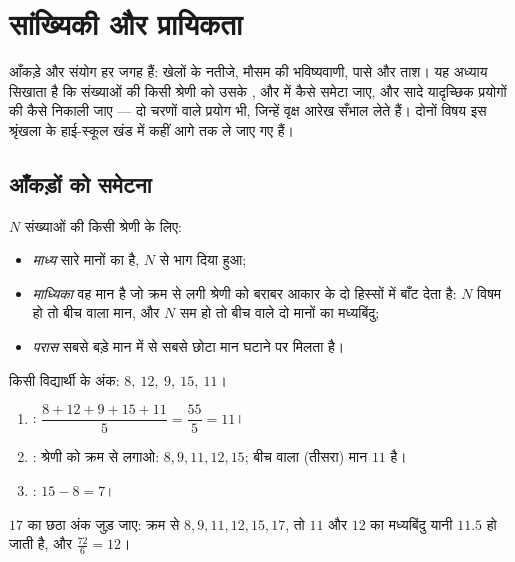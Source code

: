 \chapter{सांख्यिकी और प्रायिकता}\label{ch:g9:statproba}

आँकड़े और संयोग हर जगह हैं: खेलों के नतीजे, मौसम की भविष्यवाणी, पासे
और ताश।
यह अध्याय सिखाता है कि संख्याओं की किसी श्रेणी को उसके ,
 और  में कैसे समेटा जाए, और सादे यादृच्छिक प्रयोगों की
 कैसे निकाली जाए --- दो चरणों वाले प्रयोग भी, जिन्हें वृक्ष
आरेख सँभाल लेते हैं। दोनों विषय इस श्रृंखला के हाई-स्कूल खंड में
कहीं आगे तक ले जाए गए हैं।

\section{आँकड़ों को समेटना}

\begin{definition}[माध्य, माध्यिका, परास]\label{def:g9:statproba:indicators}
$N$ संख्याओं की किसी श्रेणी के लिए:
\begin{itemize}
  \item \emph{माध्य} सारे मानों का  है, $N$ से भाग
        दिया हुआ;
  \item \emph{माध्यिका} वह मान है जो क्रम से लगी
        श्रेणी को बराबर आकार के दो हिस्सों में बाँट देता है: $N$
        विषम हो तो बीच वाला मान, और $N$ सम हो तो बीच वाले दो मानों
        का मध्यबिंदु;
  \item \emph{परास} सबसे बड़े मान में से सबसे छोटा मान
        घटाने पर मिलता है।
\end{itemize}
\end{definition}

\begin{example}\label{ex:g9:statproba:indicators}
किसी विद्यार्थी के अंक: $8,\ 12,\ 9,\ 15,\ 11$।
\begin{enumerate}
  \item {}: $\dfrac{8 + 12 + 9 + 15 + 11}{5} = \dfrac{55}{5} = 11$।
  \item {}: श्रेणी को क्रम से लगाओ: $8, 9, 11, 12, 15$; बीच
        वाला (तीसरा) मान $11$ है।
  \item {}: $15 - 8 = 7$।
\end{enumerate}
$17$ का छठा अंक जुड़ जाए: क्रम से $8, 9, 11, 12, 15, 17$, तो
 $11$ और $12$ का मध्यबिंदु यानी $11.5$ हो जाती है, और 
$\frac{72}{6} = 12$।
\end{example}

